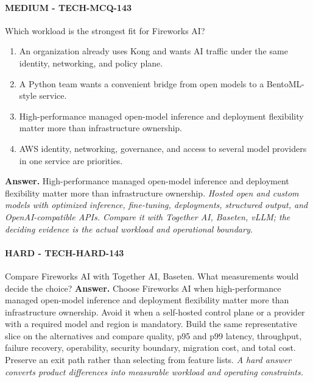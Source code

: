\paragraph{MEDIUM - TECH-MCQ-143} Which workload is the strongest fit for Fireworks AI?
\begin{enumerate}[label=\Alph*.]
\item An organization already uses Kong and wants AI traffic under the same identity, networking, and policy plane.
\item A Python team wants a convenient bridge from open models to a BentoML-style service.
\item High-performance managed open-model inference and deployment flexibility matter more than infrastructure ownership.
\item AWS identity, networking, governance, and access to several model providers in one service are priorities.
\end{enumerate}
\textbf{Answer.} High-performance managed open-model inference and deployment flexibility matter more than infrastructure ownership.
\textit{Hosted open and custom models with optimized inference, fine-tuning, deployments, structured output, and OpenAI-compatible APIs. Compare it with Together AI, Baseten, vLLM; the deciding evidence is the actual workload and operational boundary.}
\paragraph{HARD - TECH-HARD-143} Compare Fireworks AI with Together AI, Baseten. What measurements would decide the choice?
\textbf{Answer.} Choose Fireworks AI when high-performance managed open-model inference and deployment flexibility matter more than infrastructure ownership. Avoid it when a self-hosted control plane or a provider with a required model and region is mandatory. Build the same representative slice on the alternatives and compare quality, p95 and p99 latency, throughput, failure recovery, operability, security boundary, migration cost, and total cost. Preserve an exit path rather than selecting from feature lists.
\textit{A hard answer converts product differences into measurable workload and operating constraints.}
